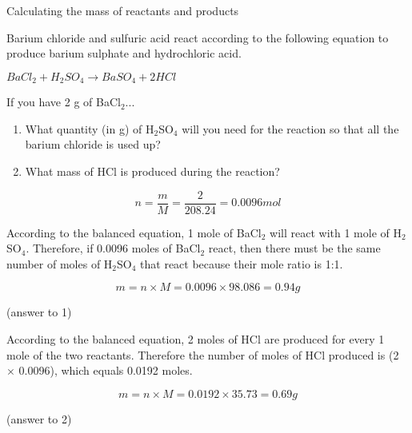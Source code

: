 \begin{wex}{Calculating the mass of reactants and products}{Barium chloride and sulfuric acid react according to the following equation to produce barium sulphate and hydrochloric acid.
\begin{center}
\rm${BaCl_{2} + H_{2}SO_{4} \rightarrow BaSO_{4} + 2HCl}$
\end{center}

If you have 2 g of BaCl$_{2}$...

\begin{enumerate}
\item{What quantity (in g) of H$_{2}$SO$_{4}$ will you need for the reaction so that all the barium chloride is used up?}
\item{What mass of HCl is produced during the reaction?}
\end{enumerate}
}

{
\begin{equation*}
n = \frac{m}{M} = \frac{2}{208.24} = 0.0096 mol
\end{equation*}
}

{
According to the balanced equation, 1 mole of BaCl$_{2}$ will react with 1 mole of H$_{2}$SO$_{4}$. Therefore, if 0.0096 moles of BaCl$_{2}$ react, then there must be the same number of moles of H$_{2}$SO$_{4}$ that react because their mole ratio is 1:1.\\
}

{

\begin{equation*}
m = n \times M = 0.0096 \times 98.086 = 0.94 g
\end{equation*}

(answer to 1)\\
}

{
According to the balanced equation, 2 moles of HCl are produced for every 1 mole of the two reactants. Therefore the number of moles of HCl produced is (2 $\times$ 0.0096), which equals 0.0192 moles. \\
}

{

\begin{equation*}
m = n \times M = 0.0192 \times 35.73 = 0.69 g
\end{equation*}

(answer to 2)
}
\end{wex}

